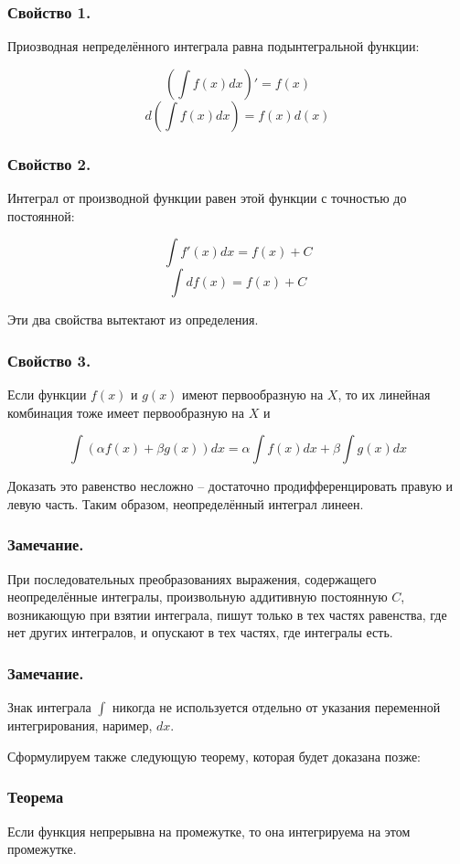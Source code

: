 \subsubsection{Свойство 1.}
Приозводная непределённого интеграла равна подынтегральной функции:

$$\left(\int f(x) dx \right)'=f(x)$$
$$d\left(\int f(x) dx \right)=f(x)d(x)$$

\subsubsection{Свойство 2.}
Интеграл от производной функции равен этой функции с точностью до постоянной:

$$\int f'(x)dx=f(x)+C$$
$$\int df(x)=f(x)+C$$

Эти два свойства вытектают из определения.

\subsubsection{Свойство 3.}
Если функции $f(x)$ и  $g(x)$ имеют первообразную на $X$, то их линейная комбинация тоже имеет первообразную на $X$ и 

$$\int(\alpha f(x) + \beta g(x))dx=\alpha \int f(x)dx+ \beta \int g(x)dx$$

Доказать это равенство несложно -- достаточно продифференцировать правую и левую часть.
Таким образом, неопределённый интеграл линеен.

\subsubsection{Замечание.}

При последовательных преобразованиях выражения, содержащего неопределённые интегралы, произвольную аддитивную постоянную $C$, возникающую при взятии интеграла, пишут только в тех частях равенства, где нет других интегралов, и опускают в тех частях, где интегралы есть.

\subsubsection{Замечание.}

Знак интеграла $\int$ никогда не используется отдельно от указания переменной интегрирования, наример, $dx$.

Сформулируем также следующую теорему, которая будет доказана позже:

\subsubsection{Теорема}

Если функция непрерывна на промежутке, то она интегрируема на этом промежутке.
